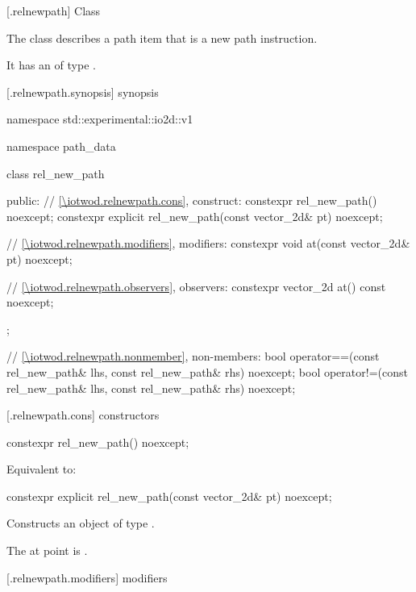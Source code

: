  [\iotwod.relnewpath] {Class }%

\pnum
{}%
The class  describes a path item that is a new path instruction.

\pnum
It has an  of type .

 [\iotwod.relnewpath.synopsis] { synopsis}%

\begin{codeblock}
namespace std::experimental::io2d::v1 {
  namespace path_data {
    class rel_new_path {
    public:
      // \ref{\iotwod.relnewpath.cons}, construct:
      constexpr rel_new_path() noexcept;
      constexpr explicit rel_new_path(const vector_2d& pt) noexcept;

      // \ref{\iotwod.relnewpath.modifiers}, modifiers:
      constexpr void at(const vector_2d& pt) noexcept;

      // \ref{\iotwod.relnewpath.observers}, observers:
      constexpr vector_2d at() const noexcept;
    };
    
    // \ref{\iotwod.relnewpath.nonmember}, non-members:
    bool operator==(const rel_new_path& lhs, const rel_new_path& rhs) noexcept;
    bool operator!=(const rel_new_path& lhs, const rel_new_path& rhs) noexcept;
  }
}
\end{codeblock}

 [\iotwod.relnewpath.cons] { constructors}%

%
\begin{itemdecl}
constexpr rel_new_path() noexcept;
\end{itemdecl}
\begin{itemdescr}
\pnum
\effects
Equivalent to: 
\end{itemdescr}

%
\begin{itemdecl}
constexpr explicit rel_new_path(const vector_2d& pt) noexcept;
\end{itemdecl}
\begin{itemdescr}
\pnum
\effects
Constructs an object of type .

\pnum
The at point is .
\end{itemdescr}

 [\iotwod.relnewpath.modifiers]{ modifiers}%

